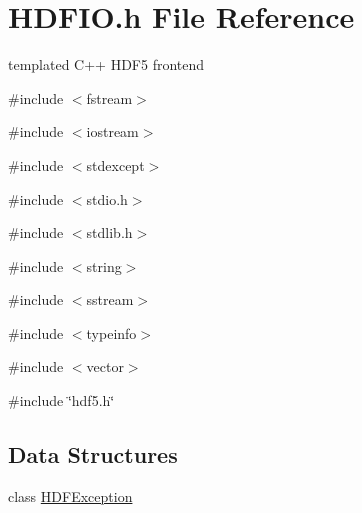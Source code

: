 \section{HDFIO.h File Reference}
\label{HDFIO_8h}


templated C++ HDF5 frontend  


{\ttfamily \#include $<$fstream$>$}\par
{\ttfamily \#include $<$iostream$>$}\par
{\ttfamily \#include $<$stdexcept$>$}\par
{\ttfamily \#include $<$stdio.h$>$}\par
{\ttfamily \#include $<$stdlib.h$>$}\par
{\ttfamily \#include $<$string$>$}\par
{\ttfamily \#include $<$sstream$>$}\par
{\ttfamily \#include $<$typeinfo$>$}\par
{\ttfamily \#include $<$vector$>$}\par
{\ttfamily \#include \char`\"{}hdf5.h\char`\"{}}\par
\subsection*{Data Structures}
\begin{DoxyCompactItemize}
\item 
class \hyperlink{classHDFException}{HDFException}
\end{DoxyCompactItemize}
